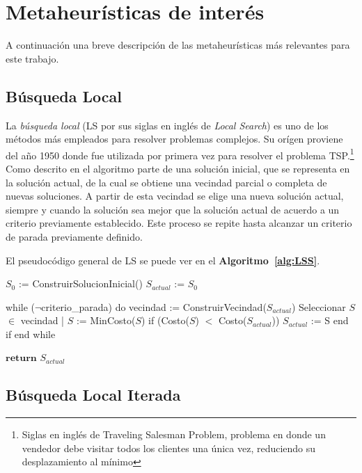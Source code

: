\section{Metaheurísticas de interés} \label{sect:interes}

A continuación una breve descripción de las metaheurísticas más relevantes para este trabajo.

\subsection{Búsqueda Local} \label{subsect:ls}

La \emph{búsqueda local} (LS por sus siglas en inglés de \emph{Local Search}) es uno de los métodos más empleados para resolver problemas complejos. Su orígen proviene del año 1950 donde fue utilizada por primera vez para resolver el problema TSP.\footnote{Siglas en inglés de Traveling Salesman Problem, problema en donde un vendedor debe visitar todos los clientes una única vez, reduciendo su desplazamiento al mínimo} 
\\
Como descrito en \cite{LocalSearchVNDDef} el algoritmo parte de una solución inicial, que se representa en la solución actual, de la cual se obtiene una vecindad parcial o completa de nuevas soluciones. A partir de esta vecindad se elige una nueva solución actual, siempre y cuando  la solución sea mejor que la solución actual de acuerdo a un criterio previamente establecido. Este proceso se repite hasta alcanzar un criterio de parada previamente definido. 

El pseudocódigo general de LS se puede ver en el \textbf{Algoritmo~\ref{alg:LSS}}.

\begin{code}[includerangemarker=false,frame=single,label=alg:LSS,caption=Pseudocódigo de Búsqueda Local,firstnumber=100, mathescape]
$S_0$ := ConstruirSolucionInicial()
$S_{actual}$ := $S_0$

while ($\neg$criterio_parada) do
	vecindad := ConstruirVecindad($S_{actual}$)
	Seleccionar $S$ $\in$ vecindad | $S$ := Min{Costo($S$)}
	if (Costo($S$) $<$ Costo($S_{actual}$))	
		$S_{actual}$ := S
	end if		
end while

$\textbf{return}$ $S_{actual}$
\end{code}

\subsection{Búsqueda Local Iterada} \label{subsect:ils}


